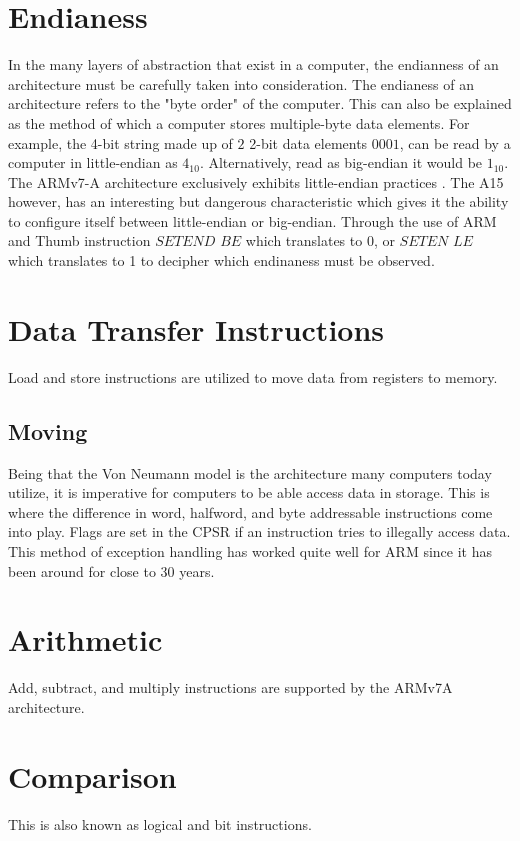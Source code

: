 \documentclass[12pt]{scrreprt}
\begin{document}
	\section{Endianess}
	In the many layers of abstraction that exist in a computer, the endianness of an architecture must be carefully taken into consideration.
	The endianess of an architecture refers to the "byte order" of the computer.
	This can also be explained as the method of which a computer stores multiple-byte data elements.
	For example, the 4-bit string made up of $2$ 2-bit data elements $0001$, can be read by a computer in little-endian as $4_{10}$. 
	Alternatively, read as big-endian it would be $1_{10}$.
	The ARMv7-A architecture exclusively exhibits little-endian practices \autocite[A2-53]{a7man}.
	The A15 however, has an interesting but dangerous characteristic which gives it the ability to configure itself between little-endian or big-endian.
	Through the use of ARM and Thumb instruction $SETEND$ $BE$ which translates to 0, or $SETEN$ $LE$ which translates to 1 to decipher which endinaness must be observed.

	\section{Data Transfer Instructions}
	Load and store instructions are utilized to move data from registers to memory.

	\subsection{Moving}
	Being that the Von Neumann model is the architecture many computers today utilize, it is imperative for computers to be able access data in storage.
	This is where the difference in word, halfword, and byte addressable instructions come into play.
	Flags are set in the CPSR if an instruction tries to illegally access data.
	This method of exception handling has worked quite well for ARM since it has been around for close to 30 years.

	\section{Arithmetic}
		Add, subtract, and multiply instructions are supported by the ARMv7A architecture.
	\section{Comparison}
		This is also known as logical and bit instructions.
\end{document}
